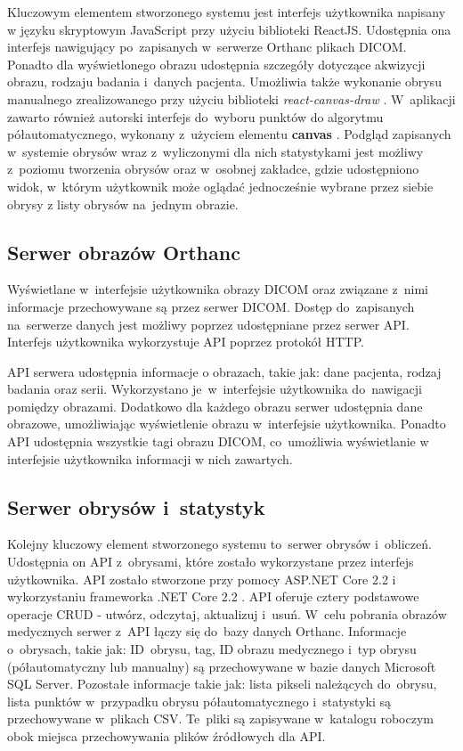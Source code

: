 \documentclass[a4paper,11pt,twoside,openright]{report}
\theoremstyle{definition}
\begin{document}
Kluczowym elementem stworzonego systemu jest interfejs użytkownika napisany w
języku skryptowym JavaScript przy użyciu biblioteki ReactJS. Udostępnia ona
interfejs nawigujący po~zapisanych w~serwerze Orthanc plikach DICOM. Ponadto dla
wyświetlonego obrazu udostępnia szczegóły dotyczące akwizycji obrazu, rodzaju badania i~danych pacjenta.
Umożliwia także wykonanie obrysu manualnego zrealizowanego przy użyciu biblioteki
\textit{react-canvas-draw} \cite{React canvas draw}. W~aplikacji zawarto również autorski interfejs do~wyboru punktów
do algorytmu półautomatycznego, wykonany z~użyciem elementu \textbf{canvas} \cite{Canvas}.
Podgląd zapisanych w~systemie obrysów wraz z~wyliczonymi dla nich statystykami
jest możliwy z~poziomu tworzenia obrysów oraz w~osobnej zakładce, gdzie udostępniono
widok, w~którym użytkownik może oglądać jednocześnie wybrane przez siebie obrysy
z listy obrysów na~jednym obrazie.

\subsection {Serwer obrazów Orthanc}

Wyświetlane w~interfejsie użytkownika obrazy DICOM oraz związane z~nimi informacje
przechowywane są przez serwer DICOM. Dostęp do~zapisanych na~serwerze danych jest
możliwy poprzez udostępniane przez serwer API. Interfejs użytkownika wykorzystuje
API poprzez protokół HTTP.

API serwera udostępnia informacje o obrazach, takie jak: dane pacjenta,
rodzaj badania oraz serii. Wykorzystano je~w~interfejsie użytkownika do~nawigacji pomiędzy
obrazami. Dodatkowo dla każdego obrazu serwer udostępnia dane obrazowe, umożliwiając
wyświetlenie obrazu w~interfejsie użytkownika. Ponadto API udostępnia wszystkie
tagi obrazu DICOM, co~umożliwia wyświetlanie w interfejsie użytkownika informacji
w nich zawartych.

\subsection {Serwer obrysów i~statystyk}
Kolejny kluczowy element stworzonego systemu to~serwer obrysów i~obliczeń. Udostępnia
on API z~obrysami, które zostało wykorzystane przez interfejs użytkownika. API zostało
stworzone przy pomocy ASP.NET Core 2.2 \cite{ASPNET} i wykorzystaniu frameworka
.NET Core 2.2 \cite{Charakterystyka dotnet}. API oferuje cztery podstawowe operacje CRUD
- utwórz, odczytaj, aktualizuj i~usuń. W~celu pobrania obrazów medycznych serwer z~API
łączy się do~bazy danych Orthanc. Informacje o~obrysach, takie jak: ID~obrysu, tag,
ID obrazu medycznego i~typ obrysu (półautomatyczny lub manualny) są przechowywane
w bazie danych Microsoft SQL Server. Pozostałe informacje takie jak: lista pikseli
należących do~obrysu, lista punktów w~przypadku obrysu półautomatycznego i~statystyki
są przechowywane w~plikach CSV. Te~pliki są zapisywane w~katalogu roboczym obok
miejsca przechowywania plików źródłowych dla API.
\end{document}
